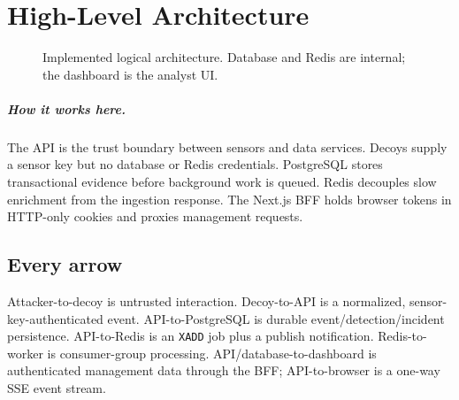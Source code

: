 \documentclass[11pt,oneside]{book}
\newcommand{\how}[1]{\paragraph{How it works here.}#1}
\begin{document}
\chapter{High-Level Architecture}
\begin{figure}[h]\centering{}\caption{Implemented logical architecture. Database and Redis are internal; the dashboard is the analyst UI.}\end{figure}
\how{The API is the trust boundary between sensors and data services. Decoys supply a sensor key but no database or Redis credentials. PostgreSQL stores transactional evidence before background work is queued. Redis decouples slow enrichment from the ingestion response. The Next.js BFF holds browser tokens in HTTP-only cookies and proxies management requests.}
\section{Every arrow}Attacker-to-decoy is untrusted interaction. Decoy-to-API is a normalized, sensor-key-authenticated event. API-to-PostgreSQL is durable event/detection/incident persistence. API-to-Redis is an \texttt{XADD} job plus a publish notification. Redis-to-worker is consumer-group processing. API/database-to-dashboard is authenticated management data through the BFF; API-to-browser is a one-way SSE event stream.
\end{document}
